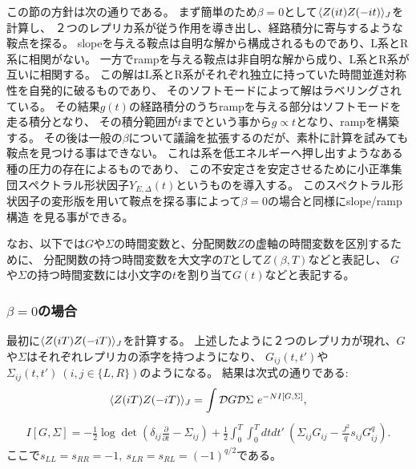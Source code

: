 この節の方針は次の通りである。
まず簡単のため$\beta=0$として$\langle Z(it)Z(-it) \rangle_J$を計算し、
２つのレプリカ系が従う作用を導き出し、経路積分に寄与するような鞍点を探る。
slopeを与える鞍点は自明な解から構成されるものであり、L系とR系に相関がない。
一方でrampを与える鞍点は非自明な解から成り、L系とR系が互いに相関する。
この解はL系とR系がそれぞれ独立に持っていた時間並進対称性を自発的に破るものであり、
そのソフトモードによって解はラベリングされている。
その結果$g(t)$の経路積分のうちrampを与える部分はソフトモードを走る積分となり、
その積分範囲が$t$までという事から$g \propto t$となり、rampを構築する。
その後は一般の$\beta$について議論を拡張するのだが、素朴に計算を試みても鞍点を見つける事はできない。
これは系を低エネルギーへ押し出すようなある種の圧力の存在によるものであり、
この不安定さを安定させるために小正準集団スペクトラル形状因子$Y_{E,\Delta}(t)$というものを導入する。
このスペクトラル形状因子の変形版を用いて鞍点を探る事によって$\beta = 0$の場合と同様にslope/ramp構造
を見る事ができる。

なお、以下では$G$や$\Sigma$の時間変数と、分配関数$Z$の虚軸の時間変数を区別するために、
分配関数の持つ時間変数を大文字の$T$として$Z(\beta, T)$などと表記し、
$G$や$\Sigma$の持つ時間変数には小文字の$t$を割り当て$G(t)$などと表記する。

\subsubsection{$\beta = 0$の場合}
最初に$\langle Z(iT)Z(-iT) \rangle_J$を計算する。
上述したように２つのレプリカが現れ、$G$や$\Sigma$はそれぞれレプリカの添字を持つようになり、
$G_{ij}(t,t')$や$\Sigma_{ij}(t,t')\ (i,j \in \{L, R\})$のようになる。
結果は次式の通りである:
\begin{align}
	\langle Z(iT)Z(-iT) \rangle_J
	= \int \mathcal{D}G\mathcal{D}\Sigma\ e^{-NI[G, \Sigma]},
\end{align}
\begin{align}
	I[G, \Sigma]
	= -\frac{1}{2}\log \det\left(
			\delta_{ij}\frac{\partial}{\partial t} - \Sigma_{ij}
		\right) + \frac{1}{2}\int_0^T\int_0^T dtdt'\ \left(
			\Sigma_{ij}G_{ij} - \frac{J^2}{q}s_{ij}G_{ij}^q
		\right).
	\label{eq:action_for_the_two_replicas}
\end{align}
ここで$s_{LL} = s_{RR} = -1,\ s_{LR} = s_{RL} = (-1)^{q/2}$である。

